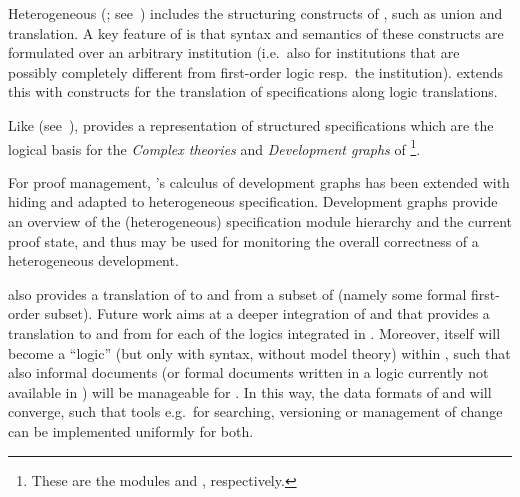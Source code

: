 Heterogeneous {\casl} ({\hetcasl}; see~\cite{Mossakowski04}) includes the structuring
constructs of {\casl}, such as union and translation.  A key feature of {\casl} is that
syntax and semantics of these constructs are formulated over an arbitrary institution
(i.e.\ also for institutions that are possibly completely different from first-order logic
resp.\ the {\casl} institution). {\hetcasl} extends this with constructs for the
translation of specifications along logic translations.


Like {\maya} (see~), {\hets} provides a representation of structured
specifications which are the logical basis for the {\emph{Complex theories}} and
{\emph{Development graphs}} of {\omdoc}\footnote{These are the modules {}
  and {}, respectively.}.

For proof management, {\maya}'s calculus of development graphs has been extended with
hiding and adapted to heterogeneous specification. Development graphs provide an overview
of the (heterogeneous) specification module hierarchy and the current proof state, and
thus may be used for monitoring the overall correctness of a heterogeneous development.


{\hets} also provides a translation of {\casl} to and from a subset of
{\omdoc} (namely some formal first-order subset).  Future work aims at
a deeper integration of {\hets} and {\omdoc} that provides a
translation to and from {\omdoc} for each of the logics integrated in
{\hets}. Moreover, {\omdoc} itself will become a ``logic'' (but only
with syntax, without model theory) within {\hets}, such that also
informal {\omdoc} documents (or formal {\omdoc} documents written in a
logic currently not available in {\hets}) will be manageable for
{\hets}. In this way, the data formats of {\omdoc} and {\hets} will
converge, such that tools e.g.\ for searching, versioning or
management of change can be implemented uniformly for both.
 


